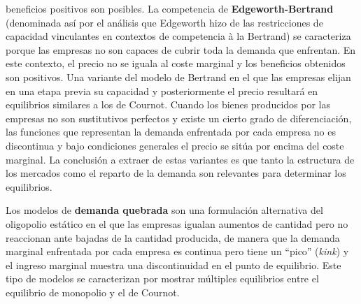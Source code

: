 \documentclass{nuevotema}
\begin{document}
beneficios positivos son posibles. La competencia de \textbf{Edgeworth-Bertrand} (denominada así por el análisis que Edgeworth hizo de las restricciones de capacidad vinculantes en contextos de competencia à la Bertrand) se caracteriza porque las empresas no son capaces de cubrir toda la demanda que enfrentan. En este contexto, el precio no se iguala al coste marginal y los beneficios obtenidos son positivos. Una variante del modelo de Bertrand en el que las empresas elijan en una etapa previa su capacidad y posteriormente el precio resultará en equilibrios similares a los de Cournot. Cuando los bienes producidos por las empresas no son sustitutivos perfectos y existe un cierto grado de diferenciación, las funciones que representan la demanda enfrentada por cada empresa no es discontinua y bajo condiciones generales el precio se sitúa por encima del coste marginal. La conclusión a extraer de estas variantes es que tanto la estructura de los mercados como el reparto de la demanda son relevantes para determinar los equilibrios.

Los modelos de \textbf{demanda quebrada} son una formulación alternativa del oligopolio estático en el que las empresas igualan aumentos de cantidad pero no reaccionan ante bajadas de la cantidad producida, de manera que la demanda marginal enfrentada por cada empresa es continua pero tiene un ``pico'' (\textit{kink}) y el ingreso marginal muestra una discontinuidad en el punto de equilibrio. Este tipo de modelos se caracterizan por mostrar múltiples equilibrios entre el equilibrio de monopolio y el de Cournot.
\end{document}

